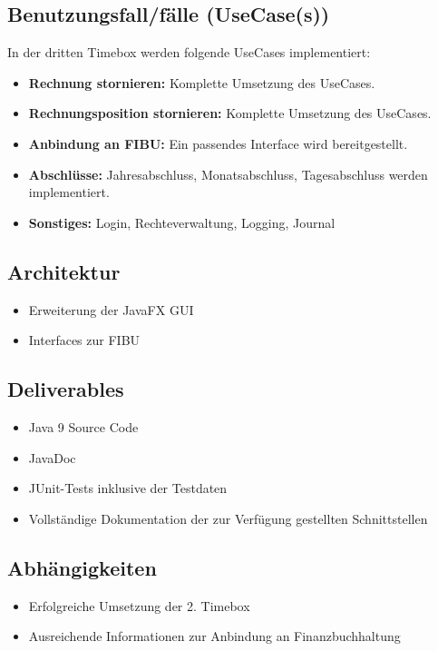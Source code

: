 \documentclass[../Pflichtenheft.tex]{subfiles}
\begin{document}
    \subsection{Benutzungsfall/fälle (UseCase(s)) }
    In der dritten Timebox werden folgende UseCases implementiert:
    \begin{itemize}
        \item \textbf{Rechnung stornieren: } Komplette Umsetzung des UseCases.
        \item \textbf{Rechnungsposition stornieren: } Komplette Umsetzung des UseCases.
        \item \textbf{Anbindung an FIBU: } Ein passendes Interface wird bereitgestellt.
        \item \textbf{Abschlüsse: } Jahresabschluss, Monatsabschluss, Tagesabschluss werden implementiert.
        \item \textbf{Sonstiges: } Login, Rechteverwaltung, Logging, Journal
    \end{itemize}
    \subsection{Architektur}
    \begin{itemize}
        \item Erweiterung der JavaFX GUI
        \item Interfaces zur FIBU
    \end{itemize}
    \subsection{Deliverables}
    \begin{itemize}
        \item Java 9 Source Code
        \item JavaDoc
        \item JUnit-Tests inklusive der Testdaten
        \item Vollständige Dokumentation der zur Verfügung gestellten Schnittstellen
    \end{itemize}
    \subsection{Abhängigkeiten}
    \begin{itemize}
        \item Erfolgreiche Umsetzung der 2. Timebox
        \item Ausreichende Informationen zur Anbindung an Finanzbuchhaltung
    \end{itemize}
\end{document}
